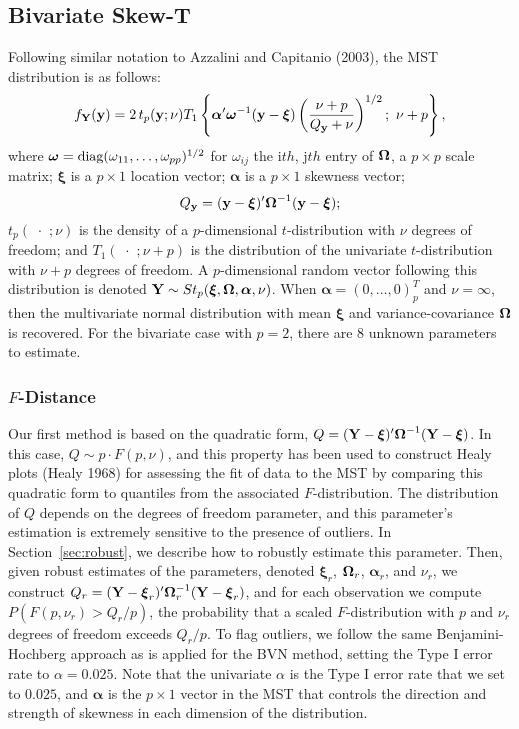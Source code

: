 \documentclass[12pt]{article}
\def\balpha{{\boldsymbol \alpha}}
\def\bY{{\bf Y}}
\def\by{{\bf y}}
\def\balpha{{\boldsymbol \alpha}}
\def\bxi{{\boldsymbol \xi}}
\def\y{\mathbf{y}}
\def\bY{{\bf Y}}
\def\by{{\bf y}}
\def\bomega{{\ensuremath\boldsymbol{\omega}}}
\def\bOmega{{\ensuremath\boldsymbol{\Omega}}}
\def\bomega{{\ensuremath\boldsymbol{\omega}}}
\def\bOmega{{\ensuremath\boldsymbol{\Omega}}}
\begin{document}
\begin{doublespacing}
\subsection{Bivariate Skew-T}\label{subsec:bst}

Following similar notation to Azzalini and Capitanio (2003), the MST distribution is as follows:
$$f_\bY(\y) = 2\,t_p(\y; \nu) T_1 \left\{\balpha'\bomega^{-1}(\y-\bxi)\left(\frac{\nu + p}{Q_{\by}+\nu} \right)^{1/2} ;\,\,\nu+p\right\},$$
where $\bomega =\mbox{diag}(\omega_{11}, \ldots, \omega_{pp})^{1/2}$ for $\omega_{ij}$ the i$th$, j$th$ entry of $\bOmega$, a $p\times p$ scale matrix; $\bxi$ is  a $p\times 1$ location vector; $\balpha$ is a $p\times 1$ skewness vector; 
$$Q_{\by} = (\by-\bxi)'\bOmega^{-1}(\by-\bxi);$$
$t_p(\,\,\cdot\,\,;\nu)$ is the density of a $p$-dimensional $t$-distribution with $\nu$ degrees of freedom; and   $T_1(\,\,\cdot\,\,;\nu+p)$ is the distribution of the univariate $t$-distribution with $\nu+p$ degrees of freedom.  A $p$-dimensional random vector following this distribution is denoted $\bY \sim St_p(\bxi, \bOmega,\balpha, \nu)$.   When $\balpha = (0, \ldots, 0)_p^T$ and $\nu=\infty$, then the multivariate normal distribution with mean $\bxi$ and variance-covariance $\bOmega$ is recovered.  For the bivariate case with $p=2$,  there are 8 unknown parameters to estimate.

\subsubsection{$F$-Distance}

Our first method is based on the  quadratic form, $Q=(\bY-\bxi)'\bOmega^{-1}(\bY-\bxi)$.  In this case, $Q\sim p\cdot F(p,\nu)$, and this property has been used to construct Healy plots (Healy 1968) for assessing the fit of data to the MST by comparing this quadratic form to quantiles from the associated $F$-distribution.  The distribution of $Q$ depends on the degrees of freedom  parameter, and this parameter's estimation is extremely sensitive to the presence of outliers.  In  Section~\ref{sec:robust}, we describe how to robustly estimate this parameter.  Then, given robust estimates of the parameters, denoted $\bxi_r$, $\bOmega_r$, $\balpha_r$, and $\nu_r$, we construct $Q_r = (\bY-\bxi_r)'\bOmega_r^{-1}(\bY-\bxi_r)$,  and for each observation we compute $P(F(p,\nu_r) > Q_r/p)$, the probability that a scaled $F$-distribution with $p$ and $\nu_r$ degrees of freedom exceeds $Q_r/p$. To flag outliers, we  follow the same Benjamini-Hochberg approach as is applied for the BVN method, setting the Type I error rate to $\alpha=0.025$. Note that the univariate $\alpha$ is the Type I error rate that we set to $0.025$, and $\balpha$ is the $p\times 1$ vector in the MST that controls the direction and strength of skewness in each dimension of the distribution.  


\end{doublespacing}
\end{document}
